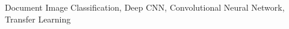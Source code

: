 \begin{IEEEkeywords}
Document Image Classification, Deep CNN, Convolutional Neural Network, Transfer Learning
\end{IEEEkeywords}




